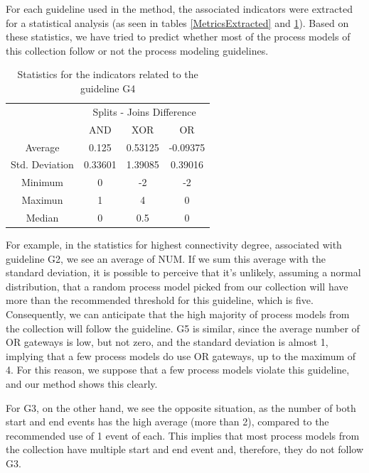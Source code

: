 \documentclass[a4paper,twoside]{article}
\begin{document}
For each guideline used in the method, the associated indicators were extracted for a statistical analysis (as seen in tables \ref{MetricsExtracted} and \ref{MetricsGateways}). Based on these statistics, we have tried to predict whether most of the process models of this collection follow or not the process modeling guidelines. 



\begin{table}[]
	\centering
	\caption{Statistics for the indicators related to the guideline G4}
	\label{MetricsGateways}
	\begin{tabular}{|c|c|c|c|}
		\hline
		\multirow{2}{*}{}  & \multicolumn{3}{c|}{Splits - Joins Difference} \\ \cline{2-4} 
		& AND            & XOR           & OR            \\ \hline
		Average            & 0.125          & 0.53125       & -0.09375      \\ \hline
		Std. Deviation & 0.33601   & 1.39085   & 0.39016   \\ \hline
		Minimum            & 0              & -2            & -2            \\ \hline
		Maximun            & 1              & 4             & 0             \\ \hline
		Median             & 0              & 0.5           & 0             \\ \hline
	\end{tabular}
\end{table}

For example, in the statistics for highest connectivity degree, associated with guideline G2, we see an average of NUM. If we sum this average with the standard deviation, it is possible to perceive that it's unlikely, assuming a normal distribution, that a random process model picked from our collection will have more than the recommended threshold for this guideline, which is five. Consequently, we can anticipate that the high majority of process models from the collection will follow the guideline. G5 is similar, since the average number of OR gateways is low, but not zero, and the standard deviation is almost 1, implying that a few process models do use OR gateways, up to the maximum of 4. For this reason, we suppose that a few process models violate this guideline, and our method shows this clearly.

For G3, on the other hand, we see the opposite situation, as the number of both start and end events has the high average (more than 2), compared to the recommended use of 1 event of each. This implies that most process models from the collection have multiple start and end event and, therefore, they do not follow G3. 
\end{document}
